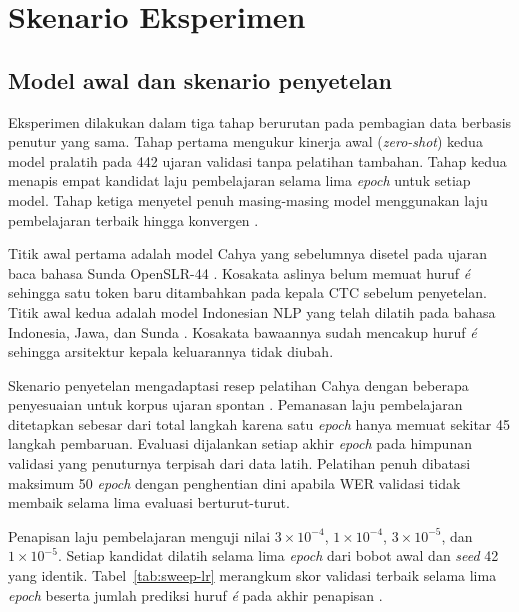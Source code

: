 \chapter{Skenario Eksperimen}
\label{bab:eksperimen}

\section{Model awal dan skenario penyetelan}

Eksperimen dilakukan dalam tiga tahap berurutan pada pembagian data berbasis penutur yang sama. Tahap pertama mengukur kinerja awal (\textit{zero-shot}) kedua model pralatih pada 442 ujaran validasi tanpa pelatihan tambahan. Tahap kedua menapis empat kandidat laju pembelajaran selama lima \textit{epoch} untuk setiap model. Tahap ketiga menyetel penuh masing-masing model menggunakan laju pembelajaran terbaik hingga konvergen \cite{repoasr}.

Titik awal pertama adalah model Cahya yang sebelumnya disetel pada ujaran baca bahasa Sunda OpenSLR-44 \cite{cahyamodel,cahyaresep}. Kosakata aslinya belum memuat huruf \textit{é} sehingga satu token baru ditambahkan pada kepala CTC sebelum penyetelan. Titik awal kedua adalah model Indonesian NLP yang telah dilatih pada bahasa Indonesia, Jawa, dan Sunda \cite{nlpmodel}. Kosakata bawaannya sudah mencakup huruf \textit{é} sehingga arsitektur kepala keluarannya tidak diubah.

Skenario penyetelan mengadaptasi resep pelatihan Cahya dengan beberapa penyesuaian untuk korpus ujaran spontan \cite{cahyaresep,repoasr}. Pemanasan laju pembelajaran ditetapkan sebesar  dari total langkah karena satu \textit{epoch} hanya memuat sekitar 45 langkah pembaruan. Evaluasi dijalankan setiap akhir \textit{epoch} pada himpunan validasi yang penuturnya terpisah dari data latih. Pelatihan penuh dibatasi maksimum 50 \textit{epoch} dengan penghentian dini apabila WER validasi tidak membaik selama lima evaluasi berturut-turut.

Penapisan laju pembelajaran menguji nilai \(3 \times 10^{-4}\), \(1 \times 10^{-4}\), \(3 \times 10^{-5}\), dan \(1 \times 10^{-5}\). Setiap kandidat dilatih selama lima \textit{epoch} dari bobot awal dan \textit{seed} 42 yang identik. Tabel~\ref{tab:sweep-lr} merangkum skor validasi terbaik selama lima \textit{epoch} beserta jumlah prediksi huruf \textit{é} pada akhir penapisan \cite{repoasr}.

